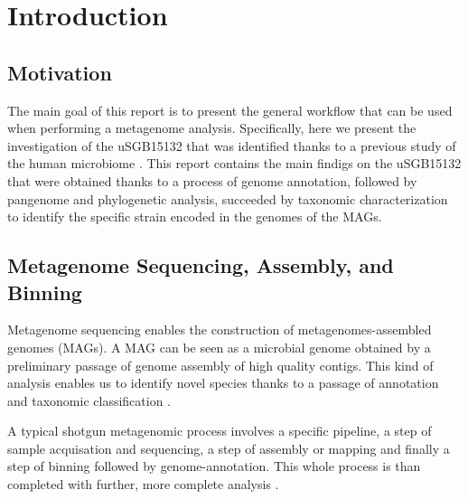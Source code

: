 \documentclass[a4paper,titlepage, oneside]{book}
\begin{document}
\begin{frontespizio}
\Istituzione{}
\Punteggiatura{}
\end{frontespizio}

\tableofcontents

\chapter{Introduction}

\section{Motivation}
The main goal of this report is to present the general workflow that can be used when performing a metagenome analysis. Specifically, here we present the investigation of the uSGB15132 that was identified thanks to a previous study of the human microbiome \cite{SGB2}.
This report contains the main findigs on the uSGB15132 that were obtained thanks to a process of genome annotation, followed by pangenome and phylogenetic analysis, succeeded by taxonomic characterization to identify the specific strain encoded in the genomes of the MAGs.



\section{Metagenome Sequencing, Assembly, and Binning}
Metagenome sequencing enables the construction of metagenomes-assembled genomes (MAGs). A MAG can be seen as a microbial genome obtained by a preliminary passage of genome assembly of high quality contigs. This kind of analysis enables us to identify novel species thanks to a passage of annotation and taxonomic classification \cite{MAG}.

A typical shotgun metagenomic process involves a specific pipeline, a step of sample acquisation and sequencing, a step of assembly or mapping and finally a step of binning followed by genome-annotation. This whole process is than completed with further, more complete analysis \cite{Metagenome}.
\end{document}
